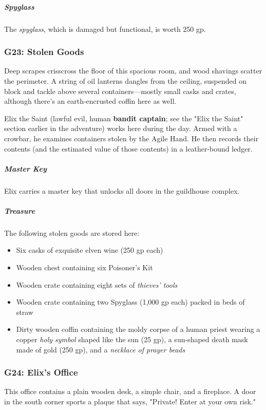\documentclass[10pt,a4paper,twoside,bg=print,twocolumn,openany,nodeprecatedcode]{dndbook}
\begin{document}
\subparagraph{Spyglass}
The \textit{spyglass}, which is damaged but functional, is worth 250 gp.

\subsubsection{G23: Stolen Goods}
\begin{DndReadAloud}{}
Deep scrapes crisscross the floor of this spacious room, and wood shavings scatter the perimeter. A string of oil lanterns dangles from the ceiling, suspended on block and tackle above several containers—mostly small casks and crates, although there's an earth-encrusted coffin here as well.

\end{DndReadAloud}

Elix the Saint (lawful evil, human \textbf{bandit captain}; see the "Elix the Saint" section earlier in the adventure) works here during the day. Armed with a crowbar, he examines containers stolen by the Agile Hand. He then records their contents (and the estimated value of those contents) in a leather-bound ledger.

\subparagraph{Master Key}
Elix carries a master key that unlocks all doors in the guildhouse complex.

\subparagraph{Treasure}
The following stolen goods are stored here:


\begin{itemize}
\item Six casks of exquisite elven wine (250 gp each)
\item Wooden chest containing six Poisoner's Kit
\item Wooden crate containing eight sets of \textit{thieves' tools}
\item Wooden crate containing two Spyglass (1,000 gp each) packed in beds of straw
\item Dirty wooden coffin containing the moldy corpse of a human priest wearing a copper \textit{holy symbol} shaped like the sun (25 gp), a sun-shaped death mask made of gold (250 gp), and a \textit{necklace of prayer beads}
\end{itemize}

\subsubsection{G24: Elix's Office}
\begin{DndReadAloud}{}
This office contains a plain wooden desk, a simple chair, and a fireplace. A door in the south corner sports a plaque that says, "Private! Enter at your own risk."

\end{DndReadAloud}
\end{document}
